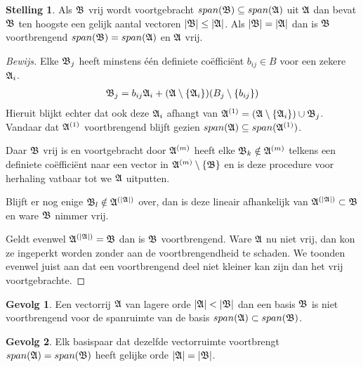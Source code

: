 \documentclass{amsart}
\theoremstyle{definition}
\newtheorem{thm}{Stelling}[section]
\newtheorem{csq}{Gevolg}[section]
\newenvironment{bewijs}{\begin{proof}[Bewijs]}{\end{proof}}
\newcommand{\setsm}[1]{\{{#1}\}}
\newcommand{\without}[1]{\setminus\setsm{#1}}
\newcommand{\abs}[1]{\lvert{#1}\rvert}
\newcommand{\vecrow}[1][a]{\mathfrak{\MakeUppercase{#1}}}
\newcommand{\rvec}[2][i]{{#2}_{#1}}
\newcommand{\rvecr}[2][i]{\rvec[#1]{\vecrow[#2]}}
\begin{document}
\begin{thm}
	Als $\vecrow[b]$ vrij wordt voortgebracht $span(\vecrow[b]) \subseteq span(\vecrow)$ uit $\vecrow$ dan bevat $\vecrow[b]$ ten hoogste een gelijk aantal vectoren $\abs{\vecrow[b]} \leq \abs\vecrow$.
	Als $\abs{\vecrow[b]} = \abs\vecrow$ dan is $\vecrow[b]$ voortbrengend $span(\vecrow[b]) = span(\vecrow)$ en $\vecrow$ vrij.
	\begin{bewijs}
		Elke $\vecrow[b]_j$ heeft minstens één definiete coëfficiënt $b_{ij} \in B$ voor een zekere $\vecrow_i$.
		\begin{align*}
			\vecrow[b]_j = b_{ij}\vecrow_i + (\vecrow \without{\vecrow_i})(B_j  \without{b_{ij}})
		\end{align*}
		Hieruit blijkt echter dat ook deze $\vecrow_i$ afhangt van  $\vecrow^{(1)} = \left(\vecrow \without{\vecrow_i}\right) \cup \rvecr[j]{b}$.
		Vandaar dat $\vecrow^{(1)}$ voortbrengend blijft gezien $span(\vecrow) \subseteq span(\vecrow^{(1)})$.

		Daar $\vecrow[b]$ vrij is en voortgebracht door $\vecrow^{(m)}$ heeft elke $\rvecr[k]{b} \notin \vecrow^{(m)}$ telkens een definiete coëfficiënt naar een vector in $\vecrow^{(m)}\without{\vecrow[b]}$
		en is deze procedure voor herhaling vatbaar tot we $\vecrow$ uitputten.

		Blijft er nog enige $\vecrow[b]_l \notin \vecrow^{(\abs{\vecrow})}$ over,
		dan is deze lineair afhankelijk van $\vecrow^{(\abs\vecrow)} \subset \vecrow[b]$ en ware $\vecrow[b]$ nimmer vrij.

		Geldt evenwel $\vecrow^{(\abs{\vecrow})} = \vecrow[b]$ dan is $\vecrow[b]$ voortbrengend.
		Ware $\vecrow$ nu niet vrij, dan kon ze ingeperkt worden zonder aan de voortbrengendheid te schaden.
		We toonden evenwel juist aan dat een voortbrengend deel niet kleiner kan zijn dan het vrij voortgebrachte.
	\end{bewijs}
\end{thm}

\begin{csq}
	Een vectorrij $\vecrow$ van lagere orde $\abs\vecrow < \abs{\vecrow[b]}$ dan een basis $\vecrow[b]$ is niet voortbrengend voor de spanruimte van de basis $span(\vecrow) \subset span(\vecrow[b])$.
\end{csq}

\begin{csq}
	Elk basispaar dat dezelfde vectorruimte voortbrengt $span(\vecrow) = span(\vecrow[b])$ heeft gelijke orde $\abs\vecrow = \abs{\vecrow[b]}$.
\end{csq}
\end{document}
